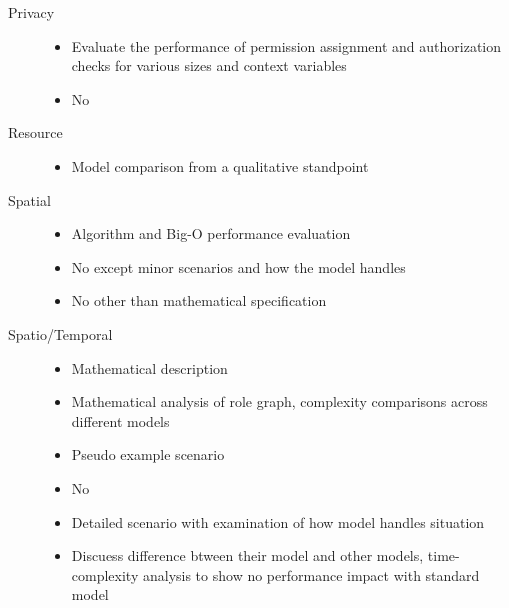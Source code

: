 \documentclass[letterpaper,10pt,english]{sphinxmanual}
\begin{document}
\begin{description}
\begin{itemize}
\end{itemize}

\item[{Privacy}] \leavevmode\begin{itemize}
\item {} 
Evaluate the performance of permission assignment and authorization checks for various sizes and context variables

\item {} 
No

\end{itemize}

\item[{Resource}] \leavevmode\begin{itemize}
\item {} 
Model comparison from a qualitative standpoint

\end{itemize}

\item[{Spatial}] \leavevmode\begin{itemize}
\item {} 
Algorithm and Big-O performance evaluation

\item {} 
No except minor scenarios and how the model handles

\item {} 
No other than mathematical specification

\end{itemize}

\item[{Spatio/Temporal}] \leavevmode\begin{itemize}
\item {} 
Mathematical description

\item {} 
Mathematical analysis of role graph, complexity comparisons across different models

\item {} 
Pseudo example scenario

\item {} 
No

\item {} 
Detailed scenario with examination of how model handles situation

\item {} 
Discuess difference btween their model and other models, time-complexity analysis to show no performance impact with standard model


\end{itemize}
\end{description}
\end{document}
